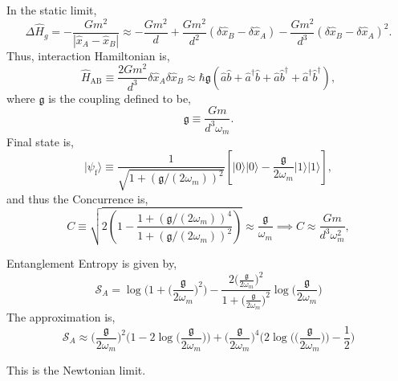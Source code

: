 \documentclass[11pt]{article}
\begin{document}
In the static limit, 
\begin{equation}\label{eq:Newton}
    \Delta \hat{H}_{g} = -\frac{Gm^2}{|\hat{x}_A - \hat{x}_B|} \approx -\frac{Gm^{2}}{d}+\frac{Gm^{2}}{d^{2}}(\delta\hat{x}_{B}-\delta\hat{x}_{A})-\frac{Gm^{2}}{d^{3}}(\delta\hat{x}_{B}-\delta\hat{x}_{A})^{2}.
\end{equation}
Thus, interaction Hamiltonian is,
\begin{equation}
\hat{H}_{\text{AB}}\equiv\frac{2Gm^{2}}{d^{3}}\delta\hat{x}_{A}\delta\hat{x}_{B} \approx \hbar\mathfrak{g}(\hat{a}\hat{b}+\hat{a}^{\dagger}\hat{b}+\hat{a}\hat{b}^{\dagger}+\hat{a}^{\dagger}\hat{b}^{\dagger}),
\end{equation}
where $\mathfrak{g}$ is the coupling defined to be,
\begin{equation}
\mathfrak{g}\equiv\frac{Gm}{d^{3}\omega_{m}}.
\end{equation}
Final state is,
\begin{equation}
\vert\psi_{\text{f}}\rangle\equiv\frac{1}{\sqrt{1+(\mathfrak{g}/(2\omega_{m}))^{2}}}[\vert0\rangle\vert0\rangle-\frac{\mathfrak{g}}{2\omega_{m}}\vert1\rangle\vert1\rangle],
\end{equation}
and thus the Concurrence is,
\begin{equation}
C\equiv\sqrt{2(1-\frac{1+(\mathfrak{g}/(2\omega_{m}))^{4}}{1+(\mathfrak{g}/(2\omega_{m}))^{2}})}\approx\frac{\mathfrak{g}}{\omega_{m}}\implies C \approx \frac{Gm}{d^{3}\omega_{m}^{2}},
\end{equation}

Entanglement Entropy is given by,
\begin{equation}
    \mathcal{S}_A = \log\Bigg(1+ \Big(\frac{\mathfrak{g}}{2\omega_{m}}\Big)^2\Bigg) - \frac{2\Big(\frac{\mathfrak{g}}{2\omega_{m}}\Big)^2}{1+\Big(\frac{\mathfrak{g}}{2\omega_{m}}\Big)^2}\log\Big(\frac{\mathfrak{g}}{2\omega_{m}}\Big)
\end{equation}
The approximation is,
\begin{equation}
    \mathcal{S}_A \approx \Big(\frac{\mathfrak{g}}{2\omega_{m}}\Big)^2 \Big(1 - 2\log\Big(\frac{\mathfrak{g}}{2\omega_{m}}\Big)\Big) + \Big(\frac{\mathfrak{g}}{2\omega_{m}}\Big)^4 \Big(2\log\Big(\Big(\frac{\mathfrak{g}}{2\omega_{m}}\Big)\Big) - \frac{1}{2}\Big)
\end{equation}

This is the Newtonian limit.
\end{document}
